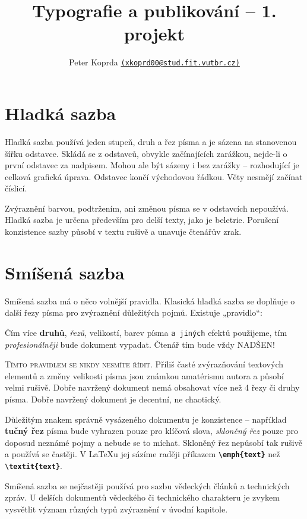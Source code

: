 \documentclass[10pt,a4paper,twocolumn]{article}
\begin{document}
    \title{Typografie a publikování \--- 1. projekt}
    \author{Peter Koprda \href{mailto:xkoprd00@stud.fit.vutbr.cz}{\texttt{(xkoprd00@stud.fit.vutbr.cz)}}}
    \date{}
    \maketitle

    \section{Hladká sazba}
    \font=3.5pt
        Hladká sazba používá jeden stupeň, druh a řez písma a je sázena na stanovenou šířku odstavce. Skládá se z odstavců, obvykle začínajících zarážkou, nejde-li o první odstavec za nadpisem. Mohou ale být sázeny i bez zarážky \--- rozhodující je celková grafická úprava. Odstavec končí východovou řádkou. Věty nesmějí začínat číslicí.\par
        Zvýraznění barvou, podtržením, ani změnou písma se v odstavcích nepoužívá. Hladká sazba je určena především pro delší texty, jako je beletrie. Porušení konzistence sazby působí v textu rušivě a unavuje čtenářův zrak.

    \font=3pt
    \section{Smíšená sazba}
        Smíšená sazba má o něco volnější pravidla. Klasická hladká sazba se doplňuje o další řezy písma pro zvýraznění důležitých pojmů. Existuje „pravidlo``:
        \begin{center}
         \begin{minipage}{7.5cm}
            Čím více \textbf{druhů}, \emph{řezů}, \footnotesize velikostí, \normalsize barev písma \texttt{a jiných} \textsf{\tiny efektů }\normalsize použijeme, tím \emph{profesionálněji} bude dokument vypadat. Čtenář tím \large bude \huge vždy \MakeUppercase{nadšen}\Huge{!}\normalsize
         \end{minipage}
         \end{center}\par
         \vspace{0.6em}
        \textsc{Tímto pravidlem se nikdy nesmíte řídit.} Příliš časté zvýrazňování textových elementů a změny velikosti písma jsou známkou amatérismu autora a působí velmi rušivě. Dobře navržený dokument nemá obsahovat více než 4 řezy či druhy písma. Dobře navržený dokument je decentní, ne chaotický.\par
        Důležitým znakem správně vysázeného dokumentu je konzistence \--- například \textbf{tučný řez} písma bude vyhrazen pouze pro klíčová slova, \emph{skloněný řez} pouze pro doposud neznámé pojmy a nebude se to míchat. Skloněný řez nepůsobí tak rušivě a používá se častěji. V \LaTeX u jej sázíme raději příkazem \cprotect\textbf{\verb!\emph{text}!} než \cprotect\textbf{\verb!\textit{text}!}.\par
        Smíšená sazba se nejčastěji používá pro sazbu vědeckých článků a technických zpráv. U delších dokumentů vědeckého či technického charakteru je zvykem vysvětlit význam různých typů zvýraznění v úvodní kapitole.
\end{document}
